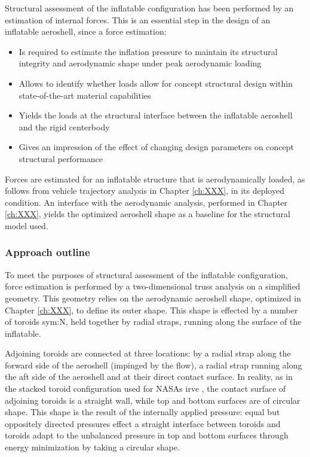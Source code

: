 Structural assessment of the inflatable configuration has been performed by an estimation of internal forces. This is an essential step in the design of an inflatable aeroshell, since a force estimation:
\begin{itemize}
\item Is required to estimate the inflation pressure to maintain its structural integrity and aerodynamic shape under peak aerodynamic loading
\item Allows to identify whether loads allow for concept structural design within state-of-the-art material capabilities
\item Yields the loads at the structural interface between the inflatable aeroshell and the rigid centerbody
\item Gives an impression of the effect of changing design parameters on concept structural performance
\end{itemize}
Forces are estimated for an inflatable structure that is aerodynamically loaded, as follows from vehicle trajectory analysis in Chapter \ref{ch:XXX}, in its deployed condition. An interface with the aerodynamic analysis, performed in Chapter \ref{ch:XXX}, yields the optimized aeroshell shape as a baseline for the structural model used.

\subsubsection{Approach outline}
To meet the purposes of structural assessment of the inflatable configuration, force estimation is performed by a two-dimensional truss analysis on a simplified geometry. This geometry relies on the aerodynamic aeroshell shape, optimized in Chapter \ref{ch:XXX}, to define its outer shape. This shape is effected by a number of toroids \gls{sym:N}, held together by radial straps, running along the surface of the inflatable. 

Adjoining toroids are connected at three locations: by a radial strap along the forward side of the aeroshell (impinged by the flow), a radial strap running along the aft side of the aeroshell and at their direct contact surface. In reality, as in the stacked toroid configuration used for NASAs \gls{irve} \cite{Lindell2006}, the contact surface of adjoining toroids is a straight wall, while top and bottom surfaces are of circular shape. This shape is the result of the internally applied pressure: equal but oppositely directed pressures effect a straight interface between toroids and toroids adapt to the unbalanced pressure in top and bottom surfaces through energy minimization by taking a circular shape.

